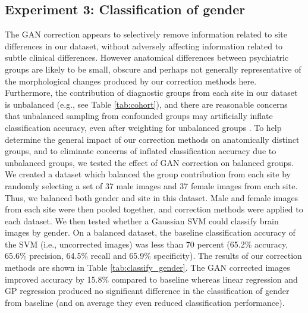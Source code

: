 \subsection{Experiment 3: Classification of gender}
The GAN correction appears to selectively remove information related to site differences in our dataset, without adversely affecting information related to subtle clinical differences. However anatomical differences between psychiatric groups are likely to be small, obscure and perhaps not generally representative of the morphological changes produced by our correction methods here. Furthermore, the contribution of diagnostic groups from each site in our dataset is unbalanced (e.g., see Table \ref{tab:cohort}), and there are reasonable concerns that unbalanced sampling from confounded groups may artificially inflate classification accuracy, even after weighting for unbalanced groups \citep{rao2017predictive}. To help determine the general impact of our correction methods on anatomically distinct groups, and to eliminate concerns of inflated classification accuracy due to unbalanced groups, we tested the effect of GAN correction on balanced groups. We created a dataset which balanced the group contribution from each site by randomly selecting a set of 37 male images and 37 female images from each site. Thus, we balanced both gender and site in this dataset. Male and female images from each site were then pooled together, and correction methods were applied to each dataset. We then tested whether a Gaussian SVM could classify brain images by gender. On a balanced dataset, the baseline classification accuracy of the SVM (i.e., uncorrected images) was less than 70 percent (65.2\% accuracy, 65.6\% precision, 64.5\% recall and 65.9\% specificity). The results of our correction methods are shown in Table \ref{tab:classify_gender}. The GAN corrected images improved accuracy by 15.8\% compared to baseline whereas linear regression and GP regression produced no significant difference in the classification of gender from baseline (and on average they even reduced classification performance).

